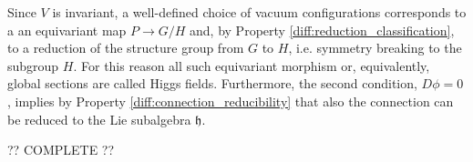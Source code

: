     Since $V$ is invariant, a well-defined choice of vacuum configurations corresponds to a an equivariant map $P\rightarrow G/H$ and, by Property \ref{diff:reduction_classification}, to a reduction of the structure group from $G$ to $H$, i.e. symmetry breaking to the subgroup $H$. For this reason all such equivariant morphism or, equivalently, global sections are called Higgs fields. Furthermore, the second condition, $D\phi=0$, implies by Property \ref{diff:connection_reducibility} that also the connection can be reduced to the Lie subalgebra $\mathfrak{h}$.

    ?? COMPLETE ??